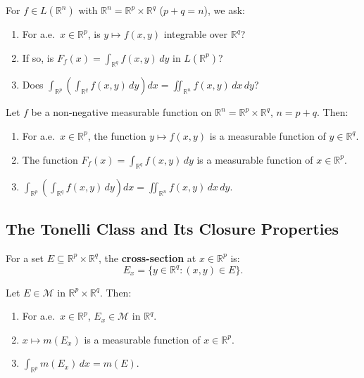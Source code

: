 \documentclass[11pt]{report}
\begin{document}
\begin{rembox}
For $f \in L(\mathbb{R}^n)$ with $\mathbb{R}^n = \mathbb{R}^p \times \mathbb{R}^q$ ($p + q = n$), we ask:
\begin{enumerate}[label=(\roman*)]
\item For a.e.\ $x \in \mathbb{R}^p$, is $y \mapsto f(x, y)$ integrable over $\mathbb{R}^q$?
\item If so, is $F_f(x) = \int_{\mathbb{R}^q} f(x, y)\,dy$ in $L(\mathbb{R}^p)$?
\item Does $\int_{\mathbb{R}^p} \left(\int_{\mathbb{R}^q} f(x,y)\,dy\right)dx = \iint_{\mathbb{R}^n} f(x,y)\,dx\,dy$?
\end{enumerate}
\end{rembox}

\begin{thmbox}
Let $f$ be a non-negative measurable function on $\mathbb{R}^n = \mathbb{R}^p \times \mathbb{R}^q$, $n = p + q$. Then:
\begin{enumerate}[label=(\roman*)]
\item For a.e.\ $x \in \mathbb{R}^p$, the function $y \mapsto f(x, y)$ is a measurable function of $y \in \mathbb{R}^q$.
\item The function $F_f(x) = \int_{\mathbb{R}^q} f(x, y)\,dy$ is a measurable function of $x \in \mathbb{R}^p$.
\item $\displaystyle\int_{\mathbb{R}^p} \left(\int_{\mathbb{R}^q} f(x, y)\,dy\right) dx = \iint_{\mathbb{R}^n} f(x, y)\,dx\,dy$.
\end{enumerate}
\end{thmbox}

\subsection{The Tonelli Class and Its Closure Properties}

\begin{defbox}
For a set $E \subseteq \mathbb{R}^p \times \mathbb{R}^q$, the \textbf{cross-section} at $x \in \mathbb{R}^p$ is:
\[
E_x = \{y \in \mathbb{R}^q : (x, y) \in E\}.
\]
\end{defbox}

\begin{thmbox}
Let $E \in \mathcal{M}$ in $\mathbb{R}^p \times \mathbb{R}^q$. Then:
\begin{enumerate}[label=(\roman*)]
\item For a.e.\ $x \in \mathbb{R}^p$, $E_x \in \mathcal{M}$ in $\mathbb{R}^q$.
\item $x \mapsto m(E_x)$ is a measurable function of $x \in \mathbb{R}^p$.
\item $\displaystyle\int_{\mathbb{R}^p} m(E_x)\,dx = m(E)$.
\end{enumerate}
\end{thmbox}
\end{document}
